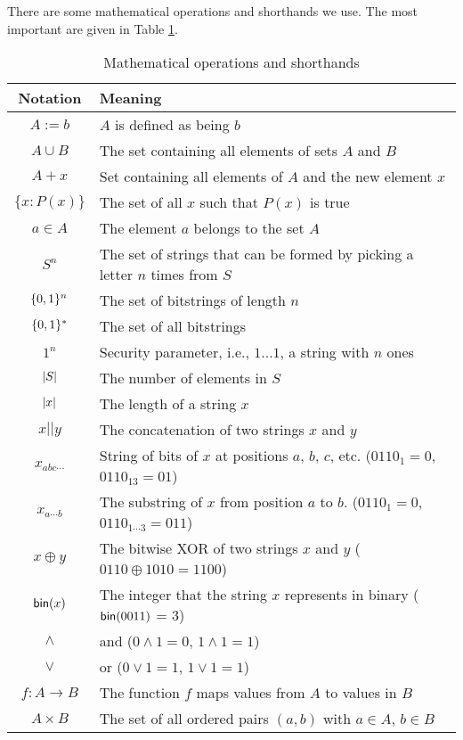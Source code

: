 There are some mathematical operations and shorthands we use. The most important are given in Table \ref{table:math}.
\begin{table}
\begin{tabular}{c | l}
Notation & Meaning \\ \hline
$A := b$ & $A$ is defined as being $b$ \\
$A \cup B$ & The set containing all elements of sets $A$ and $B$ \\
$A + x$ & Set containing all elements of $A$ and the new element $x$ \\
$\{x : P(x)\}$ & The set of all $x$ such that $P(x)$ is true \\
$a \in A$ & The element $a$ belongs to the set $A$ \\
$S^n$ & The set of strings that can be formed by picking a letter $n$ times from $S$ \\
$\{0,1\}^n$ & The set of bitstrings of length $n$ \\
$\{0,1\}^*$ & The set of all bitstrings \\
$1^n$ & Security parameter, i.e., $1...1$, a string with $n$ ones\\
$\left\lvert S\right\rvert$ & The number of elements in $S$ \\
$\left\lvert x\right\rvert$ & The length of a string $x$ \\
$x||y$ & The concatenation of two strings $x$ and $y$ \\
$x_{abc\cdots}$ & String of bits of $x$ at positions $a$, $b$, $c$, etc. ($0110_1 = 0$, $0110_{13}=01$) \\
$x_{a \cdots b}$ & The substring of $x$ from position $a$ to $b$. ($0110_1 = 0$, $0110_{1 \cdots 3}=011$) \\
$x\oplus y$ & The bitwise XOR of two strings $x$ and $y$ ($0110 \oplus 1010 = 1100$) \\
$\textsf{bin}(x)$ & The integer that the string $x$ represents in binary ($\textsf{bin}(0011)$ = 3) \\ 
$\wedge$ & and ($0 \wedge 1 = 0$, $1 \wedge 1 = 1$) \\
$\vee$ & or ($0 \vee 1 = 1$, $1 \vee 1 = 1$)\\
$f: A \to B$ & The function $f$ maps values from $A$ to values in $B$\\
$A \times B$ & The set of all ordered pairs $(a,b)$ with $a \in A$, $b \in B$\\
\end{tabular}
\caption{Mathematical operations and shorthands}\label{table:math}
\end{table}

